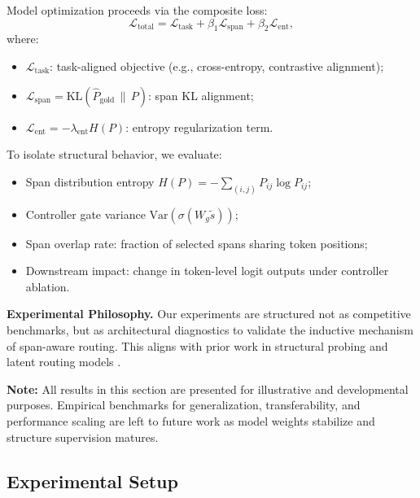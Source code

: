 Model optimization proceeds via the composite loss:
\begin{equation}
\mathcal{L}_{\text{total}} = \mathcal{L}_{\text{task}} + \beta_1 \mathcal{L}_{\text{span}} + \beta_2 \mathcal{L}_{\text{ent}},
\label{eq:exp_loss_summary}
\end{equation}
where:
\begin{itemize}[leftmargin=1.8em]
    \item \(\mathcal{L}_{\text{task}}\): task-aligned objective (e.g., cross-entropy, contrastive alignment);
    \item \(\mathcal{L}_{\text{span}} = \mathrm{KL}(\hat{P}_{\text{gold}} \,\|\, P)\): span KL alignment;
    \item \(\mathcal{L}_{\text{ent}} = - \lambda_{\text{ent}} H(P)\): entropy regularization term.
\end{itemize}

To isolate structural behavior, we evaluate:
\begin{itemize}
  \item Span distribution entropy \(H(P) = -\sum_{(i,j)} P_{ij} \log P_{ij}\);
  \item Controller gate variance \(\mathrm{Var}(\sigma(W_g \tilde{s}))\);
  \item Span overlap rate: fraction of selected spans sharing token positions;
  \item Downstream impact: change in token-level logit outputs under controller ablation.
\end{itemize}

\vspace{0.5em}
\noindent\textbf{Experimental Philosophy.}
Our experiments are structured not as competitive benchmarks, but as architectural diagnostics to validate the inductive mechanism of span-aware routing. This aligns with prior work in structural probing and latent routing models \cite{gupta2022molt, tay2020sparse, clark2018semi}.

\vspace{0.75em}
\textbf{Note:} All results in this section are presented for illustrative and developmental purposes. Empirical benchmarks for generalization, transferability, and performance scaling are left to future work as model weights stabilize and structure supervision matures.








\subsection{Experimental Setup}
\label{sec:experimental-setup}

